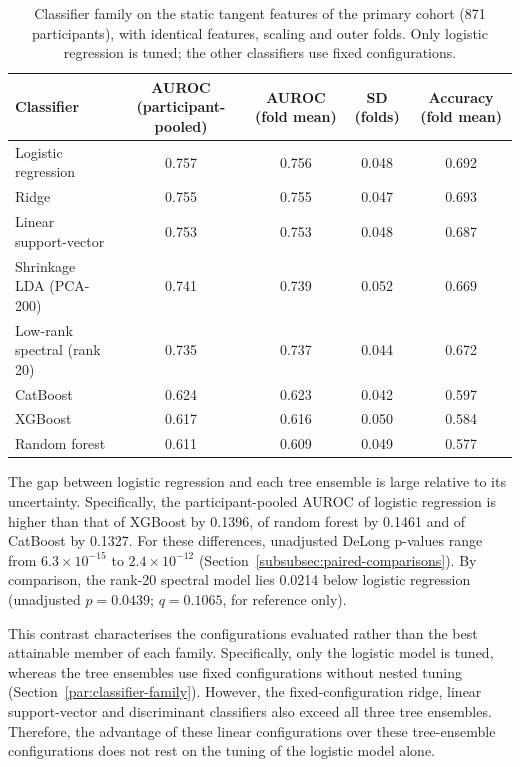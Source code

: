 \begin{table}[t]
\centering
\caption{Classifier family on the static tangent features of the primary cohort
(871 participants), with identical features, scaling and outer folds. Only logistic
regression is tuned; the other classifiers use fixed configurations.}
\label{tab:classifier-family}
\small
\setlength{\tabcolsep}{4pt}
\begin{tabular}{@{}lcccc@{}}
\toprule
Classifier & AUROC (participant-pooled) & AUROC (fold mean) & SD (folds) & Accuracy (fold mean) \\
\midrule
Logistic regression & 0.757 & 0.756 & 0.048 & 0.692 \\
Ridge & 0.755 & 0.755 & 0.047 & 0.693 \\
Linear support-vector & 0.753 & 0.753 & 0.048 & 0.687 \\
Shrinkage LDA (PCA-200) & 0.741 & 0.739 & 0.052 & 0.669 \\
Low-rank spectral (rank 20) & 0.735 & 0.737 & 0.044 & 0.672 \\
CatBoost & 0.624 & 0.623 & 0.042 & 0.597 \\
XGBoost & 0.617 & 0.616 & 0.050 & 0.584 \\
Random forest & 0.611 & 0.609 & 0.049 & 0.577 \\
\bottomrule
\end{tabular}
\end{table}

The gap between logistic regression and each tree ensemble is large relative to its
uncertainty. Specifically, the participant-pooled AUROC of logistic regression is higher
than that of XGBoost by 0.1396, of random forest by 0.1461 and of CatBoost by 0.1327. For these differences,
unadjusted DeLong p-values range from $6.3\times10^{-15}$ to $2.4\times10^{-12}$
(Section~\ref{subsubsec:paired-comparisons}). By comparison, the rank-20 spectral model lies 0.0214 below
logistic regression (unadjusted $p=0.0439$; $q=0.1065$, for reference only).

This contrast characterises the configurations evaluated rather than the best attainable
member of each family. Specifically, only the logistic model is tuned, whereas the tree
ensembles use fixed configurations without nested tuning (Section~\ref{par:classifier-family}).
However, the fixed-configuration ridge, linear support-vector and discriminant classifiers
also exceed all three tree ensembles. Therefore, the advantage of these linear
configurations over these tree-ensemble configurations does not rest on the tuning of the
logistic model alone.

